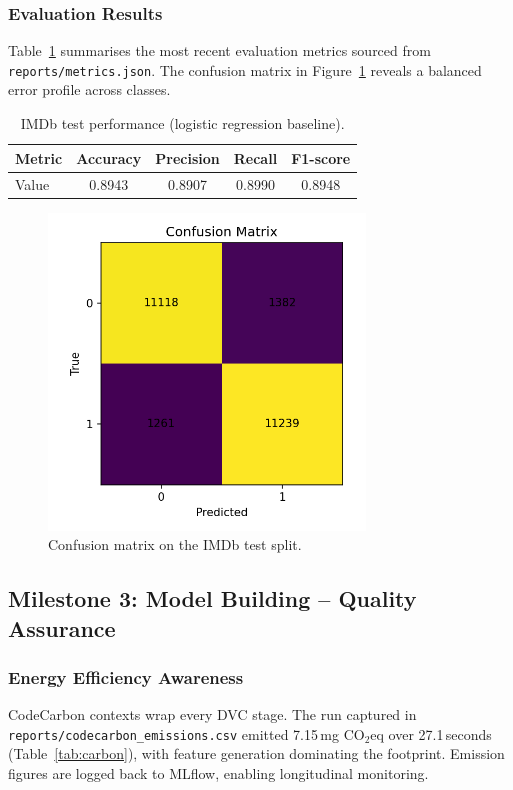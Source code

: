 \documentclass[11pt,a4paper]{article}
\begin{document}
\subsubsection*{Evaluation Results}
Table~\ref{tab:metrics} summarises the most recent evaluation metrics sourced from \texttt{reports/metrics.json}. The confusion matrix in Figure~\ref{fig:cm} reveals a balanced error profile across classes.

\begin{table}[H]
  \centering
  \caption{IMDb test performance (logistic regression baseline).}
  \label{tab:metrics}
  \begin{tabular}{lcccc}
    \toprule
    Metric & Accuracy & Precision & Recall & F1-score \\
    \midrule
    Value & 0.8943 & 0.8907 & 0.8990 & 0.8948 \\
    \bottomrule
  \end{tabular}
\end{table}

\begin{figure}[H]
  \centering
  \includegraphics[width=0.75\textwidth]{baseline_confusion_matrix.png}
  \caption{Confusion matrix on the IMDb test split.}
  \label{fig:cm}
\end{figure}

\subsection{Milestone 3: Model Building -- Quality Assurance}
\subsubsection{Energy Efficiency Awareness}
CodeCarbon contexts wrap every DVC stage. The run captured in \texttt{reports/codecarbon\_emissions.csv} emitted 7.15\,mg CO\(_2\)eq over 27.1\,seconds (Table~\ref{tab:carbon}), with feature generation dominating the footprint. Emission figures are logged back to MLflow, enabling longitudinal monitoring.
\end{document}
